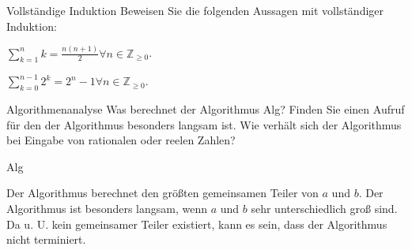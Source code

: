 \documentclass{exercisesheet}
\author{Leopold Lemmermann}
\begin{document}
\createtitle

\begin{eexercises}{Vollständige Induktion}{
    Beweisen Sie die folgenden Aussagen mit vollständiger Induktion:
  }
  \item $\sum_{k=1}^{n}{k} = \frac{n(n+1)}{2}\forall n \in \mathbb{Z}_{\ge 0}$.
  \item $\sum_{k=0}^{n-1} 2^k = 2^n-1\forall n \in \mathbb{Z}_{\ge 0}$.
\end{eexercises}

\begin{solutions}
  \item {}
  \item {}
\end{solutions}

\begin{exercise}{Algorithmenanalyse}
  Was berechnet der Algorithmus Alg? Finden Sie einen Aufruf für den der Algorithmus besonders langsam ist. Wie verhält sich der Algorithmus bei Eingabe von rationalen oder reelen Zahlen?
  \begin{algorithm}[ht]
    \caption{Alg}
  \end{algorithm}

  \begin{solution}
    Der Algorithmus berechnet den größten gemeinsamen Teiler von $a$ und $b$. Der Algorithmus ist besonders langsam, wenn $a$ und $b$ sehr unterschiedlich groß sind. Da u. U. kein gemeinsamer Teiler existiert, kann es sein, dass der Algorithmus nicht terminiert.
  \end{solution}
\end{exercise}
\end{document}

